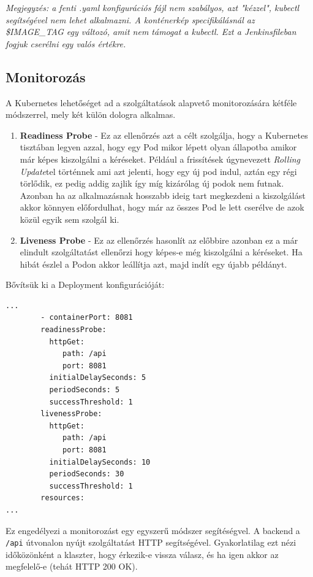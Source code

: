 \textit{Megjegyzés: a fenti .yaml konfigurációs fájl nem szabályos, azt "kézzel", kubectl segítségével nem lehet alkalmazni. A konténerkép specifikálásnál az \$IMAGE\_TAG egy változó, amit nem támogat a kubectl. Ezt a Jenkinsfileban fogjuk cserélni egy valós értékre.}

\subsection{Monitorozás}
A Kubernetes lehetőséget ad a szolgáltatások alapvető monitorozására kétféle módszerrel, mely két külön dologra alkalmas.
\begin{enumerate}
    \item \textbf{Readiness Probe} - Ez az ellenőrzés azt a célt szolgálja, hogy a Kubernetes tisztában legyen azzal, hogy egy Pod mikor lépett olyan állapotba amikor már képes kiszolgálni a kéréseket. Például a frissítések úgynevezett \textit{Rolling Update}tel történnek ami azt jelenti, hogy egy új pod indul, aztán egy régi törlődik, ez pedig addig zajlik így míg kizárólag új podok nem futnak. Azonban ha az alkalmazásnak hosszabb ideig tart megkezdeni a kiszolgálást akkor könnyen előfordulhat, hogy már az összes Pod le lett cserélve de azok közül egyik sem szolgál ki.
    \item \textbf{Liveness Probe} - Ez az ellenőrzés hasonlít az előbbire azonban ez a már elindult szolgáltatást ellenőrzi hogy képes-e még kiszolgálni a kéréseket. Ha hibát észlel a Podon akkor leállítja azt, majd indít egy újabb példányt.
\end{enumerate}
Bővítsük ki a Deployment konfigurációját:
\begin{lstlisting}
...
        - containerPort: 8081
        readinessProbe:
          httpGet:
             path: /api
             port: 8081
          initialDelaySeconds: 5
          periodSeconds: 5
          successThreshold: 1
        livenessProbe:
          httpGet:
             path: /api
             port: 8081
          initialDelaySeconds: 10
          periodSeconds: 30
          successThreshold: 1
        resources:
...
\end{lstlisting}
Ez engedélyezi a monitorozást egy egyszerű módszer segítéségvel. A backend a \lstinline{/api} útvonalon nyújt szolgáltatást HTTP segítségével. Gyakorlatilag ezt nézi időközönként a klaszter, hogy érkezik-e vissza válasz, és ha igen akkor az megfelelő-e (tehát HTTP 200 OK).
